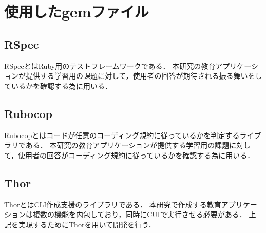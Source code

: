 \section{使用したgemファイル}\label{ux4f7fux7528ux3057ux305fgemux30d5ux30a1ux30a4ux30eb}
\subsection{RSpec}\label{rspec}
RSpec\cite{rspec}とはRuby用のテストフレームワークである．
本研究の教育アプリケーションが提供する学習用の課題に対して，使用者の回答が期待される振る舞いをしているかを確認する為に用いる．

\subsection{Rubocop}\label{rubocop}
Rubocop\cite{rubocop}とはコードが任意のコーディング規約に従っているかを判定するライブラリである．
本研究の教育アプリケーションが提供する学習用の課題に対して，使用者の回答がコーディング規約に従っているかを確認する為に用いる．

\subsection{Thor}\label{thor}
Thor\cite{thor}とはCLI作成支援のライブラリである．
本研究で作成する教育アプリケーションは複数の機能を内包しており，同時にCUIで実行させる必要がある．
上記を実現するためにThorを用いて開発を行う．

